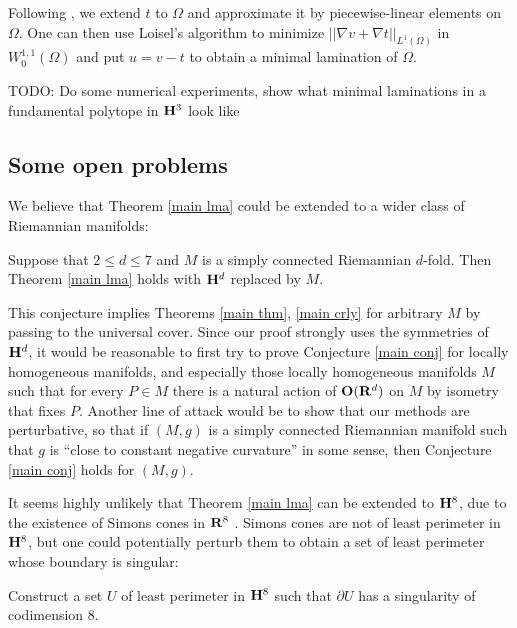 Following \cite[\S4]{Loisel20}, we extend $t$ to $\Omega$ and approximate it by piecewise-linear elements on $\Omega$.
One can then use Loisel's algorithm to minimize $||\nabla v + \nabla t||_{L^1(\Omega)}$ in $W^{1, 1}_0(\Omega)$ and put $u = v - t$ to obtain a minimal lamination of $\Omega$.

TODO: Do some numerical experiments, show what minimal laminations in a fundamental polytope in $\mathbf H^3$ look like



\subsection{Some open problems}
We believe that Theorem \ref{main lma} could be extended to a wider class of Riemannian manifolds:

\begin{conjecture}\label{main conj}
Suppose that $2 \leq d \leq 7$ and $M$ is a simply connected Riemannian $d$-fold. Then Theorem \ref{main lma} holds with $\mathbf H^d$ replaced by $M$.
\end{conjecture}

This conjecture implies Theorems \ref{main thm}, \ref{main crly} for arbitrary $M$ by passing to the universal cover.
Since our proof strongly uses the symmetries of $\mathbf H^d$, it would be reasonable to first try to prove Conjecture \ref{main conj} for locally homogeneous manifolds, and especially those locally homogeneous manifolds $M$ such that for every $P \in M$ there is a natural action of $\mathbf{O}(\mathbf{R}^d)$ on $M$ by isometry that fixes $P$.
Another line of attack would be to show that our methods are perturbative, so that if $(M, g)$ is a simply connected Riemannian manifold such that $g$ is ``close to constant negative curvature'' in some sense, then Conjecture \ref{main conj} holds for $(M, g)$.

It seems highly unlikely that Theorem \ref{main lma} can be extended to $\mathbf H^8$, due to the existence of Simons cones in $\mathbf{R}^8$ \cite[Theorem A]{BOMBIERI1969}.
Simons cones are not of least perimeter in $\mathbf H^8$, but one could potentially perturb them to obtain a set of least perimeter whose boundary is singular:

\begin{problem}
    Construct a set $U$ of least perimeter in $\mathbf H^8$ such that $\partial U$ has a singularity of codimension $8$.
\end{problem}

